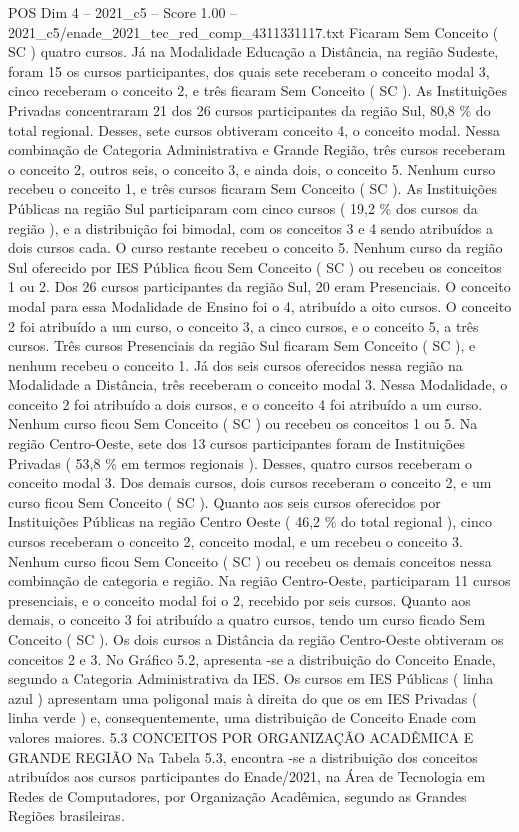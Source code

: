 \begin{textsample}{POS Dim 4 – 2021\_c5 – Score 1.00 – 2021\_c5/enade\_2021\_tec\_red\_comp\_4311331117.txt}
Ficaram Sem Conceito ( SC ) quatro cursos.
Já na Modalidade Educação a Distância, na região Sudeste, foram 15 os cursos participantes, dos quais sete receberam o conceito modal 3, cinco receberam o conceito 2, e três ficaram Sem Conceito ( SC ).
As Instituições Privadas concentraram 21 dos 26 cursos participantes da região Sul, 80,8 \% do total regional.
Desses, sete cursos obtiveram conceito 4, o conceito modal.
Nessa combinação de Categoria Administrativa e Grande Região, três cursos receberam o conceito 2, outros seis, o conceito 3, e ainda dois, o conceito 5.
Nenhum curso recebeu o conceito 1, e três cursos ficaram Sem Conceito ( SC ).
As Instituições Públicas na região Sul participaram com cinco cursos ( 19,2 \% dos cursos da região ), e a distribuição foi bimodal, com os conceitos 3 e 4 sendo atribuídos a dois cursos cada.
O curso restante recebeu o conceito 5.
Nenhum curso da região Sul oferecido por IES Pública ficou Sem Conceito ( SC ) ou recebeu os conceitos 1 ou 2.
Dos 26 cursos participantes da região Sul, 20 eram Presenciais.
O conceito modal para essa Modalidade de Ensino foi o 4, atribuído a oito cursos.
O conceito 2 foi atribuído a um curso, o conceito 3, a cinco cursos, e o conceito 5, a três cursos.
Três cursos Presenciais da região Sul ficaram Sem Conceito ( SC ), e nenhum recebeu o conceito 1.
Já dos seis cursos oferecidos nessa região na Modalidade a Distância, três receberam o conceito modal 3.
Nessa Modalidade, o conceito 2 foi atribuído a dois cursos, e o conceito 4 foi atribuído a um curso.
Nenhum curso ficou Sem Conceito ( SC ) ou recebeu os conceitos 1 ou 5.
Na região Centro-Oeste, sete dos 13 cursos participantes foram de Instituições Privadas ( 53,8 \% em termos regionais ).
Desses, quatro cursos receberam o conceito modal 3.
Dos demais cursos, dois cursos receberam o conceito 2, e um curso ficou Sem Conceito ( SC ).
Quanto aos seis cursos oferecidos por Instituições Públicas na região Centro Oeste ( 46,2 \% do total regional ), cinco cursos receberam o conceito 2, conceito modal, e um recebeu o conceito 3.
Nenhum curso ficou Sem Conceito ( SC ) ou recebeu os demais conceitos nessa combinação de categoria e região.
Na região Centro-Oeste, participaram 11 cursos presenciais, e o conceito modal foi o 2, recebido por seis cursos.
Quanto aos demais, o conceito 3 foi atribuído a quatro cursos, tendo um curso ficado Sem Conceito ( SC ).
Os dois cursos a Distância da região Centro-Oeste obtiveram os conceitos 2 e 3.
No Gráfico 5.2, apresenta -se a distribuição do Conceito Enade, segundo a Categoria Administrativa da IES.
Os cursos em IES Públicas ( linha azul ) apresentam uma poligonal mais à direita do que os em IES Privadas ( linha verde ) e, consequentemente, uma distribuição de Conceito Enade com valores maiores. 5.3 CONCEITOS POR ORGANIZAÇÃO ACADÊMICA E GRANDE REGIÃO Na Tabela 5.3, encontra -se a distribuição dos conceitos atribuídos aos cursos participantes do Enade/2021, na Área de Tecnologia em Redes de Computadores, por Organização Acadêmica, segundo as Grandes Regiões brasileiras.

\end{textsample}
